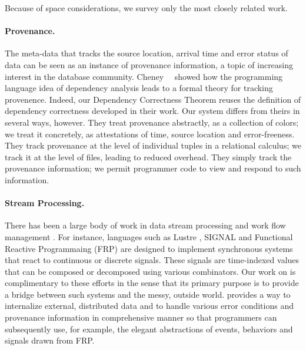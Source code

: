 
Because of space considerations, we survey only the most closely related work.

\paragraph*{Provenance.}  The \padsd{} meta-data that tracks the
source location, arrival time and error status of data can be seen as
an instance of provenance information, a topic of increasing interest
in the database community.  Cheney~\etal{}~\cite{cheney-dbpl07} showed
how the programming language idea of dependency analysis leads to a
formal theory for tracking provenence.  Indeed, our Dependency
Correctness Theorem reuses the definition of dependency correctness
developed in their work.  Our system differs from theirs in several
ways, however.  They treat provenance abstractly, as a collection of
colors; we treat it concretely, as attestations of time, source
location and error-freeness.  They track provenance at the level of
individual tuples in a relational calculus; we track it at the level
of files, leading to reduced overhead.  They simply track the
provenance information; we permit programmer code to view and
respond to such information.

\paragraph*{Stream Processing.}
There has been a large body of work in data stream processing and work
flow management \cite{Golab03}. For instance, languages such as Lustre
\cite{CaspiPHP87}, SIGNAL \cite{AmagbegnonBG95} and Functional
Reactive Programmaing (FRP) \cite{ElliottH97,WanH00} are designed to
implement synchronous systems that react to continuous or discrete
signals. These signals are time-indexed values that can be composed or
decomposed using various combinators.  Our work on \padsd{} is
complimentary to these efforts in the sense that its primary purpose
is to provide a bridge between such systems and the messy, outside
world.  \padsd{} provides a way to internalize external, distributed
data and to handle various error conditions and provenance information
in comprehensive manner so that programmers can subsequently use, for
example, the elegant abstractions of events, behaviors and signals
drawn from FRP.


